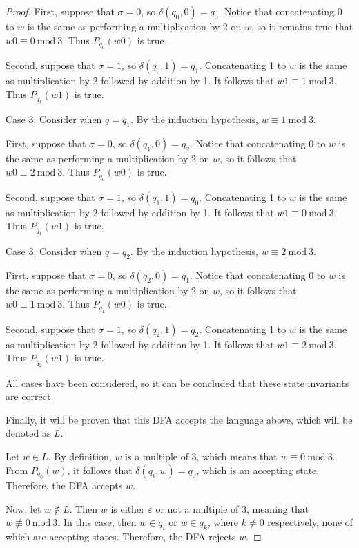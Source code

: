 \documentclass[11pt]{article}
\begin{document}
\begin{enumerate}[label=\textbf{Q\arabic*.}]
\begin{enumerate}[label=\textit{\alph*)}]
\begin{proof}
		First, suppose that \(\sigma = 0\), so \(\delta (q_0, 0) = q_0\). Notice that concatenating 0 to \(w\) is the same as performing a multiplication by 2 on \(w\), so it remains true that \(w0 \equiv 0\ \mathrm{mod} \ 3\). Thus \(P_{q_0}(w0)\) is true.

		Second, suppose that \(\sigma = 1\), so \(\delta (q_0, 1) = q_1\). Concatenating 1 to \(w\) is the same as multiplication by 2 followed by addition by 1. It follows that \(w1 \equiv 1\ \mathrm{mod} \ 3\). Thus \(P_{q_1}(w1)\) is true.

		Case 3: Consider when \(q = q_1\). By the induction hypothesis, \(w \equiv 1\ \mathrm{mod} \ 3\).

		First, suppose that \(\sigma = 0\), so \(\delta (q_1, 0) = q_2\). Notice that concatenating 0 to \(w\) is the same as performing a multiplication by 2 on \(w\), so it follows that \(w0 \equiv 2\ \mathrm{mod} \ 3\). Thus \(P_{q_0}(w0)\) is true.

		Second, suppose that \(\sigma = 1\), so \(\delta (q_1, 1) = q_0\). Concatenating 1 to \(w\) is the same as multiplication by 2 followed by addition by 1. It follows that \(w1 \equiv 0\ \mathrm{mod} \ 3\). Thus \(P_{q_1}(w1)\) is true.

		Case 3: Consider when \(q = q_2\). By the induction hypothesis, \(w \equiv 2\ \mathrm{mod} \ 3\).

		First, suppose that \(\sigma = 0\), so \(\delta (q_2, 0) = q_1\). Notice that concatenating 0 to \(w\) is the same as performing a multiplication by 2 on \(w\), so it follows that \(w0 \equiv 1\ \mathrm{mod} \ 3\). Thus \(P_{q_1}(w0)\) is true.

		Second, suppose that \(\sigma = 1\), so \(\delta (q_2, 1) = q_2\). Concatenating 1 to \(w\) is the same as multiplication by 2 followed by addition by 1. It follows that \(w1 \equiv 2\ \mathrm{mod} \ 3\). Thus \(P_{q_2}(w1)\) is true.

		All cases have been considered, so it can be concluded that these state invariants are correct.

		Finally, it will be proven that this DFA accepts the language above, which will be denoted as \(L\).

		Let \(w \in L\). By definition, \(w\) is a multiple of 3, which means that \(w \equiv 0\ \mathrm{mod} \ 3\). From \(P_{q_0}(w)\), it follows that \(\delta (q_i, w) = q_0\), which is an accepting state. Therefore, the DFA accepts \(w\).

		Now, let \(w \notin L\). Then \(w\) is either \(\varepsilon\) or not a multiple of 3, meaning that \(w \not\equiv 0\ \mathrm{mod} \ 3\). In this case, then \(w \in q_i\) or \(w \in q_k\), where \(k\neq 0\) respectively, none of which are accepting states. Therefore, the DFA rejects \(w\).


\end{proof}
\end{enumerate}
\end{enumerate}
\end{document}

